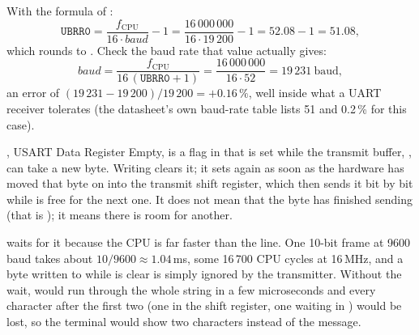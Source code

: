 
With the formula of :
\[
  \mathtt{UBRR0} = \frac{f_\mathrm{CPU}}{16 \cdot \mathit{baud}} - 1
  = \frac{16\,000\,000}{16 \cdot 19\,200} - 1 = 52.08 - 1 = 51.08,
\]
which rounds to . Check the baud rate that value actually gives:
\[
  \mathit{baud} = \frac{f_\mathrm{CPU}}{16\,(\mathtt{UBRR0} + 1)} = \frac{16\,000\,000}{16 \cdot 52}
  = 19\,231~\mathrm{baud},
\]
an error of $(19\,231 - 19\,200)/19\,200 = +0.16\,\%$, well inside what a UART receiver tolerates
(the datasheet's own baud-rate table lists 51 and 0.2\,\% for this case).

, USART Data Register Empty, is a flag in  that is set while the transmit
buffer, , can take a new byte. Writing  clears it; it sets again as soon as
the hardware has moved that byte on into the transmit shift register, which then sends it bit by
bit while  is free for the next one. It does not mean that the byte has finished
sending (that is ); it means there is room for another.

 waits for it because the CPU is far faster than the line. One 10-bit
frame at 9600 baud takes about $10/9600 \approx 1.04$\,ms, some 16\,700 CPU cycles at 16\,MHz, and
a byte written to  while  is clear is simply ignored by the transmitter.
Without the wait,  would run through the whole string in a few microseconds
and every character after the first two (one in the shift register, one waiting in )
would be lost, so the terminal would show two characters instead of the message.
